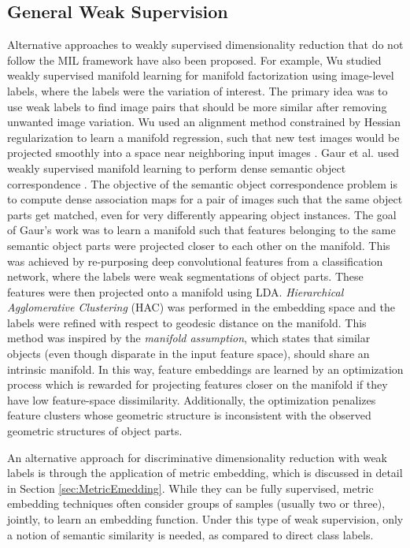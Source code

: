 \subsection{General Weak Supervision}
Alternative approaches to weakly supervised dimensionality reduction that do not follow the MIL framework have also been proposed.  For example, Wu studied weakly supervised manifold learning for manifold factorization using image-level labels, where the labels were the variation of interest.  The primary idea was to use weak labels to find image pairs that should be more similar after removing unwanted image variation.  Wu used an alignment method constrained by Hessian regularization to learn a manifold regression, such that new test images would be projected smoothly into a space near neighboring input images \citep{Wu2015MILImageManifoldThesis}.  Gaur et al. used weakly supervised manifold learning to perform dense semantic object correspondence \citep{Gaur2017MILSemanticObjectCorrespondence}. The objective of the semantic object correspondence problem is to compute dense association maps for a pair of images such that the same object parts get matched, even for very differently appearing object instances. The goal of Gaur's work was to learn a manifold such that features belonging to the same semantic object parts were projected closer to each other on the manifold. This was achieved by re-purposing deep convolutional features from a classification network, where the labels were weak segmentations of object parts.  These features were then projected onto a manifold using LDA. \textit{Hierarchical Agglomerative Clustering} (HAC) was performed in the embedding space and the labels were refined with respect to geodesic distance on the manifold.  This method was inspired by the \textit{manifold assumption}, which states that similar objects (even though disparate in the input feature space), should share an intrinsic manifold.  In this way, feature embeddings are learned by an optimization process which is rewarded for projecting features closer on the manifold if they have low feature-space dissimilarity.  Additionally, the optimization penalizes feature clusters whose geometric structure is inconsistent with the observed geometric structures of object parts.  

An alternative approach for discriminative dimensionality reduction with weak labels is through the application of metric embedding, which is discussed in detail in Section \ref{sec:MetricEmedding}.  While they can be fully supervised, metric embedding techniques often consider groups of samples (usually two or three), jointly, to learn an embedding function.  Under this type of weak supervision, only a notion of semantic similarity is needed,  as compared to direct class labels. 


